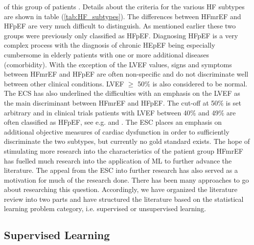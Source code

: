\documentclass[../thesis.tex]{subfiles}
\begin{document}


\vspace*{-0,2cm}\noindent of this group of patients \citep{ponikowski2016}. Details about the criteria for the various HF subtypes are shown in table (\ref{tab:HF_subtypes}). The differences between HFmrEF and HFpEF are very much difficult to distinguish. As mentioned earlier these two groups were previously only classified as HFpEF. Diagnosing HFpEF is a very complex process with the diagnosis of chronic HEpEF being especially cumbersome in elderly patients with one or more additional diseases (comorbidity). With the exception of the LVEF values, signs and symptoms between HFmrEF and HFpEF are often non-specific and do not discriminate well between other clinical conditions. LVEF $\geq$ 50\% is also considered to be normal. The ECS has also underlined the difficulties with an emphasis on the LVEF as the main discriminant between HFmrEF and HFpEF. The cut-off at 50\% is set arbitrary and in clinical trials patients with LVEF between 40\% and 49\% are often classified as HFpEF, see e.g. \cite{kelly2015patient} and \cite{ponikowski2016}. The ESC places an emphasis on additional objective measures of cardiac dysfunction in order to sufficiently discriminate the two subtypes, but currently no gold standard exists. The hope of stimulating more research into the characteristics of the patient group HFmrEF has fuelled much research into the application of ML to further advance the literature. The appeal from the ESC into further research has also served as a motivation for much of the research done. There has been many approaches to go about researching this question. Accordingly, we have organized the literature review into two parts and have structured the literature based on the statistical learning problem category, i.e. supervised or unsupervised learning.

\subsection{Supervised Learning}
\label{subsec:supervisedlearn}
\end{document}
